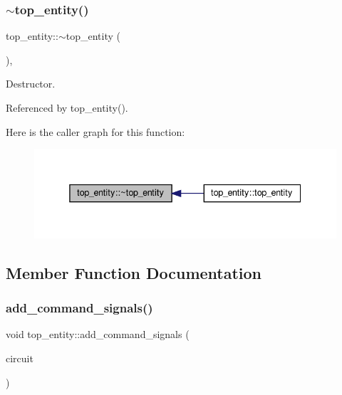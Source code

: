 \subsubsection{\texorpdfstring{$\sim$top\+\_\+entity()}{~top\_entity()}}
{\footnotesize\ttfamily top\+\_\+entity\+::$\sim$top\+\_\+entity (\begin{DoxyParamCaption}{ }\end{DoxyParamCaption})\hspace{0.3cm}{\ttfamily [virtual]}, {\ttfamily [default]}}



Destructor. 



Referenced by top\+\_\+entity().

Here is the caller graph for this function\+:
\nopagebreak
\begin{figure}[H]
\begin{center}
\leavevmode
\includegraphics[width=338pt]{d0/d0e/classtop__entity_a5a61bc3f8b01888887203ce9408eaddf_icgraph}
\end{center}
\end{figure}


\subsection{Member Function Documentation}
\mbox{\label{classtop__entity_afe2e448da9ea30c2b071b1c477cb5c9a}} 
\subsubsection{\texorpdfstring{add\+\_\+command\+\_\+signals()}{add\_command\_signals()}}
{\footnotesize\ttfamily void top\+\_\+entity\+::add\+\_\+command\+\_\+signals (\begin{DoxyParamCaption}\item[{\hyperlink{structural__objects_8hpp_a8ea5f8cc50ab8f4c31e2751074ff60b2}{structural\+\_\+object\+Ref}}]{circuit }\end{DoxyParamCaption})\hspace{0.3cm}{\ttfamily [protected]}}



